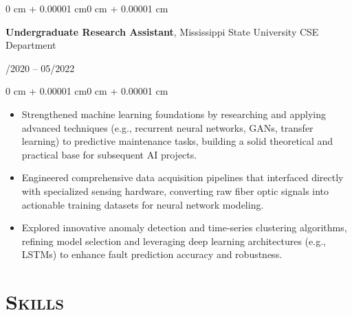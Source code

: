 \documentclass[11pt, letterpaper]{article}
\newenvironment{highlights}{
    \begin{itemize}[
        topsep=0.10 cm,
        parsep=0.10 cm,
        partopsep=0pt,
        itemsep=0pt,
        leftmargin=0.4 cm + 10pt
    ]
}{
    \end{itemize}
}
\newenvironment{onecolentry}{
    \begin{adjustwidth}{0 cm + 0.00001 cm}{0 cm + 0.00001 cm}
}{
    \end{adjustwidth}
}
\newenvironment{twocolentry}[1]{
    \onecolentry
    \def\secondColumn{#1}
    \setcolumnwidth{\fill,4.5cm}
    \begin{paracol}{2}
}{
    \switchcolumn \raggedleft \secondColumn
    \end{paracol}
    \endonecolentry
}
\begin{document}
\vspace{0.4 cm}

\begin{twocolentry}{09/2020 – 05/2022}
    \textbf{Undergraduate Research Assistant}, Mississippi State University CSE Department
\end{twocolentry}

\vspace{0.10 cm}
\begin{onecolentry}
    \begin{highlights}
        \item Strengthened machine learning foundations by researching and applying advanced techniques (e.g., recurrent neural networks, GANs, transfer learning) to predictive maintenance tasks, building a solid theoretical and practical base for subsequent AI projects.
        \item Engineered comprehensive data acquisition pipelines that interfaced directly with specialized sensing hardware, converting raw fiber optic signals into actionable training datasets for neural network modeling.
        \item Explored innovative anomaly detection and time-series clustering algorithms, refining model selection and leveraging deep learning architectures (e.g., LSTMs) to enhance fault prediction accuracy and robustness.
    \end{highlights}
\end{onecolentry}

\section{\scshape Skills}
\end{document}

